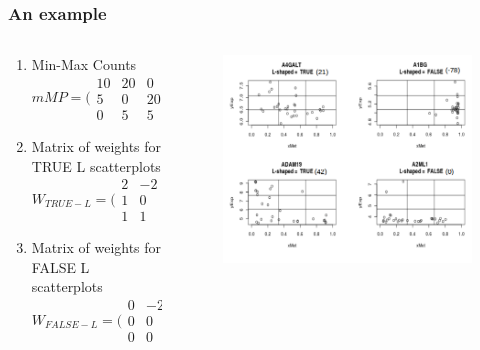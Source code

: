 \documentclass[handout]{beamer}
\begin{document}
\begin{frame}
	\frametitle{An example}

\begin{columns}%
	\begin{column}[t]{0.4\textwidth}%

\begin{enumerate}

\item Min-Max Counts
$$
mMP =\bigl(\begin{smallmatrix}
	10 & 20 & 0\\ 
	5 & 0 & 20\\ 
	0 & 5 & 5
\end{smallmatrix}\bigr)
$$

\item Matrix of weights for TRUE L scatterplots
$$
W_{TRUE-L} =\bigl(\begin{smallmatrix}
2 & -2 & -25\\ 
1 & 0 & -2\\ 
1 & 1 & 2
\end{smallmatrix}\bigr)
$$

\item Matrix of weights for FALSE L scatterplots
$$
W_{FALSE-L} =\bigl(\begin{smallmatrix}
0 & -2 & -25\\ 
0 & 0 & -2\\ 
0 & 0 & 0
\end{smallmatrix}\bigr)
$$

\end{enumerate}

	\end{column}
	\begin{column}[t]{0.6\textwidth}%
		\bigskip
		\begin{center}
			\begin{figure}[h]          
				\includegraphics[width=\textwidth]{images/LshapeAndNonLshapeScored}
			\end{figure}
		\end{center}
	\end{column}
\end{columns}	
	
\end{frame}
\end{document}
